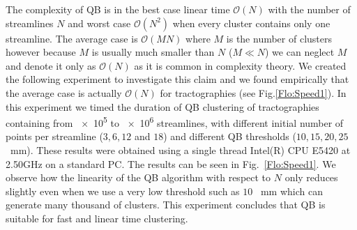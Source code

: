 \documentclass{bioinfo}
\begin{document}
The complexity of QB is in the best case linear time $\mathcal{O}(N)$
with the number of streamlines $N$ and worst case $\mathcal{O}(N^{2})$
when every cluster contains only one streamline. The average case is
$\mathcal{O}(MN)$ where $M$ is the number of clusters however because
$M$ is usually much smaller than $N$ ($M\ll N$) we can neglect $M$ and
denote it only as $\mathcal{O}(N)$ as it is common in complexity
theory. We created the following experiment to investigate this claim
and we found empirically that the average case is actually
$\mathcal{O}(N)$ for tractographies (see Fig.\ref{Flo:Speed1}).  In this
experiment we timed the duration of QB clustering of tractographies
containing from \num{e5} to \num{e6} streamlines, with different initial
number of points per streamline ($3,6,12$ and $18$) and different QB
thresholds ($10,15,20,25$~mm). These results were obtained using a
single thread Intel(R) CPU E5420 at 2.50GHz on a standard PC. The
results can be seen in Fig.~\ref{Flo:Speed1}. We observe how the
linearity of the QB algorithm with respect to $N$ only reduces slightly
even when we use a very low threshold such as $10$ ~mm which can
generate many thousand of clusters. This experiment concludes that QB is
suitable for fast and linear time clustering.
\end{document}
